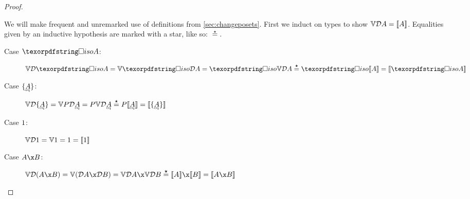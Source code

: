 \documentclass{rntz}\usepackage[a5]{rntzgeometry}\usepackage[fullwidth=130mm,width=330pt,]{narrow}
\begin{document}

\thmForget*
\begin{proof}\label{proof:forget}

  We will make frequent and unremarked use of definitions from
  \cref{sec:changeposets}. First we induct on types to show $\mathbb{V}{\mathcal{D} A} =
  \llbracket{A}\rrbracket$. Equalities given by an inductive hypothesis are marked with a star,
  like so: $\stareq$.

  \begin{description}
    \item[Case $\isof A$:] \(\vals{\incdens{\isof A}}
      = \vals{\discof{\incdens A}}
      = \isof{\vals{\incdens A}} \stareq \isof{\den A}
      = \den{\isof A} \)


    \item[Case $\tset{\eqt A}$:]
      \(\vals{\incdens{\tset{\eqt A}}}
      = \vals{\pfinof{\incdens{\eqt A}}}
      = \pfinof{\vals{\incdens{\eqt A}}}
      \stareq \pfinof{\den{\eqt A}}
      = \den{\tset{\eqt A}} \)


    \item[Case $1$:] \(\mathbb{V}{\mathcal{D} 1} = \mathbb{V}1 = 1 = \llbracket{1}\rrbracket\)

    \item[Case $A \x B$:] \(\vals{\incden{A \x B}}
      = \vals{(\incdens A \x \incdens B)}
      = \vals{\incdens A} \x \vals{\incdens B}
      \stareq \den{A} \x \den{B}
      = \den{A \x B} \)


\end{description}
\end{proof}
\end{document}

